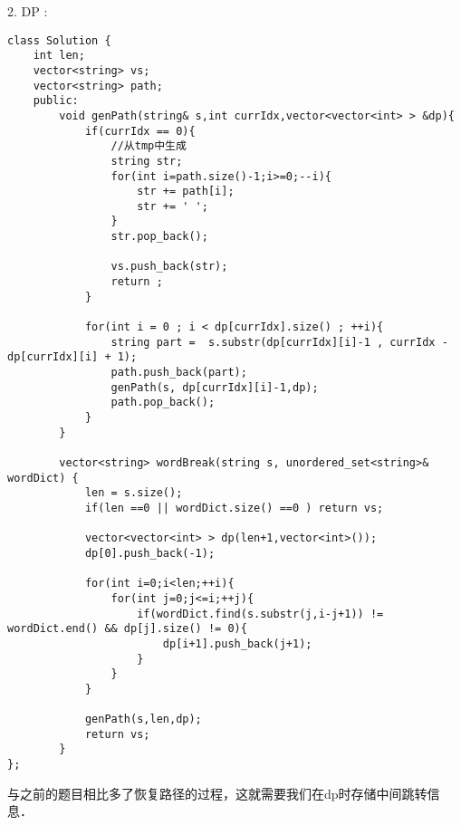 \begin{description}
	\item{2. DP} : \\
    \begin{lstlisting}
class Solution {
	int len;
	vector<string> vs;
	vector<string> path;
	public:
		void genPath(string& s,int currIdx,vector<vector<int> > &dp){
			if(currIdx == 0){
				//从tmp中生成
				string str;
				for(int i=path.size()-1;i>=0;--i){
					str += path[i];
					str += ' ';
				}
				str.pop_back();
				
				vs.push_back(str);
				return ;
			}

			for(int i = 0 ; i < dp[currIdx].size() ; ++i){
				string part =  s.substr(dp[currIdx][i]-1 , currIdx - dp[currIdx][i] + 1);
				path.push_back(part);
				genPath(s, dp[currIdx][i]-1,dp);
				path.pop_back();
			}
		}

		vector<string> wordBreak(string s, unordered_set<string>& wordDict) {
			len = s.size();
			if(len ==0 || wordDict.size() ==0 )	return vs;

			vector<vector<int> > dp(len+1,vector<int>());
			dp[0].push_back(-1);

			for(int i=0;i<len;++i){
				for(int j=0;j<=i;++j){
					if(wordDict.find(s.substr(j,i-j+1)) != wordDict.end() && dp[j].size() != 0){
						dp[i+1].push_back(j+1);
					}
				}
			}

			genPath(s,len,dp);
			return vs;
		}
};
    \end{lstlisting}
	与之前的题目相比多了恢复路径的过程，这就需要我们在dp时存储中间跳转信息．
\end{description}

